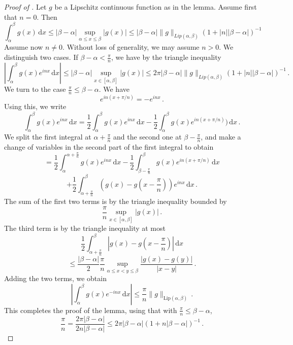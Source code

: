 \begin{proof}[Proof of ]
\leanok
Let $g$ be a Lipschitz continuous function as in the lemma.
Assume first that $n=0$. Then
\begin{equation*}
    \int_\alpha^\beta g(x) \, \mathrm{d}x \le |\beta - \alpha| \sup_{\alpha\le x\le \beta}|g(x)|
    \le |\beta-\alpha|\|g\|_{Lip(\alpha,\beta)}(1+|n||\beta-\alpha|)^{-1}
\end{equation*}
Assume now $n\ne 0$. Without loss of generality, we may assume $n>0$.
We distinguish two cases. If $\beta-\alpha < \frac{\pi}{n}$, we have by the triangle inequality
\begin{equation*}
    \left|\int_\alpha^\beta g(x) e^{inx} \, \mathrm{d}x\right|
    \le |\beta -\alpha| \sup_{x \in [\alpha,\beta]} |g(x)|
    \le 2\pi |\beta-\alpha|\|g\|_{Lip(\alpha,\beta)}(1+|n||\beta-\alpha|)^{-1} \,.
\end{equation*}
We turn to the case $\frac{\pi}{n} \le \beta-\alpha$.
We have
$$
    e^{in(x + \pi/n)} = -e^{inx}\,.
$$
Using this, we write
$$
    \int_\alpha^\beta g(x) e^{inx} \, \mathrm{d}x
    = \frac{1}{2} \int_\alpha^\beta g(x) e^{inx} \, \mathrm{d}x - \frac{1}{2} \int_\alpha^\beta g(x) e^{in(x + \pi/n)}) \, \mathrm{d}x\,.
$$
We split the first integral at $\alpha + \frac{\pi}{n}$ and the second one at $\beta - \frac{\pi}{n}$, and make a change of variables in the second part of the first integral to obtain
$$
    = \frac{1}{2} \int_{\alpha}^{\alpha + \frac{\pi}{n}} g(x) e^{inx} \, \mathrm{d}x - \frac{1}{2} \int_{\beta - \frac{\pi}{n}}^{\beta} g(x) e^{in(x + \pi/n)} \, \mathrm{d}x
$$
$$
    + \frac{1}{2} \int_{\alpha + \frac{\pi}{n}}^{\beta} (g(x) - g(x - \frac{\pi}{n})) e^{inx} \, \mathrm{d}x\,.
$$
The sum of the first two terms is by the triangle inequality bounded by
$$
    \frac{\pi}{n} \sup_{x \in [\alpha,\beta]} |g(x)|\,.
$$
The third term is by the triangle inequality at most
$$
    \frac{1}{2} \int_{\alpha + \frac{\pi}{n}}^\beta |g(x) - g(x - \frac{\pi}{n})| \, \mathrm{d}x
$$
$$
    \le \frac{|\beta-\alpha|}{2} \frac{\pi}{n} \sup_{\alpha \le x < y \le \beta} \frac{|g(x) - g(y)|}{|x-y|}\,.
$$
Adding the two terms, we obtain
$$
    \left|\int_\alpha^\beta g(x) e^{-inx} \, \mathrm{d}x\right| \le \frac{\pi}{n} \|g\|_{\mathrm{Lip}(\alpha,\beta)}\,.
$$
This completes the proof of the lemma, using that with $\frac{\pi}{n} \le \beta-\alpha$,
$$
    \frac{\pi}{n} = \frac{2 \pi |\beta-\alpha|}{2n|\beta-\alpha|} \le 2 \pi |\beta-\alpha|(1 + n|\beta-\alpha|)^{-1}\,.
$$
\end{proof}


